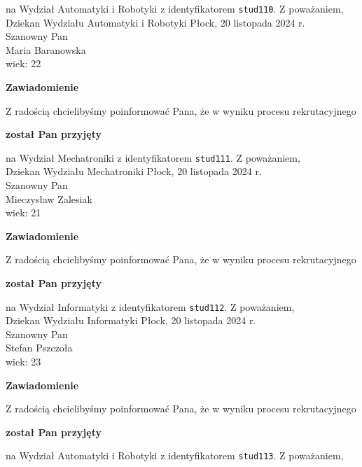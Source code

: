 \documentclass[12pt,a4paper]{article}
\begin{document}
na Wydział Automatyki i Robotyki z identyfikatorem \verb|stud110|. 
\vspace{2cm}
\noindent
Z poważaniem,\\
Dziekan
Wydziału Automatyki i Robotyki
\newpage
\hfill Płock, 20 listopada 2024 r.\\
\noindent 
Szanowny Pan \\
Maria Baranowska \\
wiek: 22
\bigskip
\begin{center}
 	{\Large\textbf{Zawiadomienie}}
\end{center}
\bigskip
Z radością chcielibyśmy poinformować Pana, że w wyniku procesu rekrutacyjnego 
\begin{center}
\textsf{\textbf{został Pan przyjęty}} 
\end{center}
na Wydział Mechatroniki z identyfikatorem \verb|stud111|. 
\vspace{2cm}
\noindent
Z poważaniem,\\
Dziekan
Wydziału Mechatroniki
\newpage
\hfill Płock, 20 listopada 2024 r.\\
\noindent 
Szanowny Pan \\
Mieczysław Zalesiak \\
wiek: 21
\bigskip
\begin{center}
 	{\Large\textbf{Zawiadomienie}}
\end{center}
\bigskip
Z radością chcielibyśmy poinformować Pana, że w wyniku procesu rekrutacyjnego 
\begin{center}
\textsf{\textbf{został Pan przyjęty}} 
\end{center}
na Wydział Informatyki z identyfikatorem \verb|stud112|. 
\vspace{2cm}
\noindent
Z poważaniem,\\
Dziekan
Wydziału Informatyki
\newpage
\hfill Płock, 20 listopada 2024 r.\\
\noindent 
Szanowny Pan \\
Stefan Pszczoła \\
wiek: 23
\bigskip
\begin{center}
 	{\Large\textbf{Zawiadomienie}}
\end{center}
\bigskip
Z radością chcielibyśmy poinformować Pana, że w wyniku procesu rekrutacyjnego 
\begin{center}
\textsf{\textbf{został Pan przyjęty}} 
\end{center}
na Wydział Automatyki i Robotyki z identyfikatorem \verb|stud113|. 
\vspace{2cm}
\noindent
Z poważaniem,\\
\end{document}
